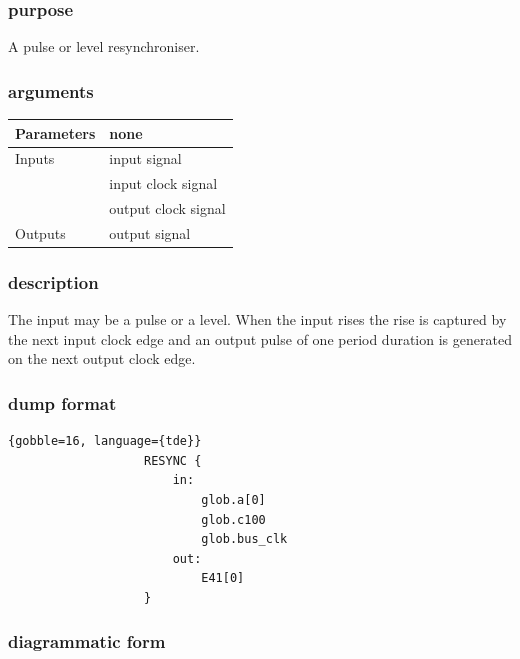             \subsubsection{purpose}
            
                A pulse or level resynchroniser.

            \subsubsection{arguments}
            
                \begin{tabular}{| l | l |}
                \hline
                Parameters  & none \\
                \hline
                Inputs      & input signal \\
                            & input clock signal \\
                            & output clock signal \\
                \hline
                Outputs     & output signal \\
                \hline
                \end{tabular}

            \subsubsection{description}

                The input may be a pulse or a level. When the input rises the
                rise is captured by the next input clock edge and an output
                pulse of one period duration is generated on the next output
                clock edge.

            \subsubsection{dump format}
            
                \begin{lstlisting}{gobble=16, language={tde}}
                   RESYNC {
                       in:
                           glob.a[0]
                           glob.c100
                           glob.bus_clk
                       out:
                           E41[0]
                   }
                \end{lstlisting}

            \subsubsection{diagrammatic form}

